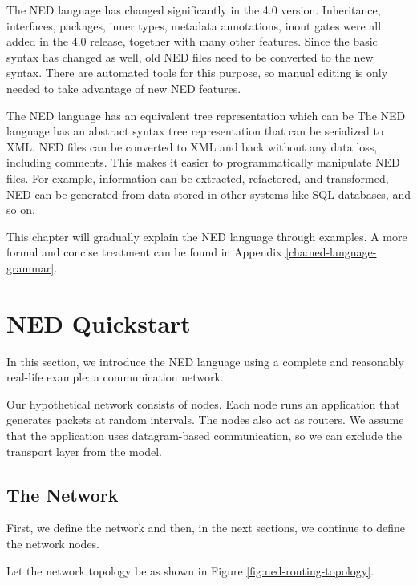 \begin{note}
    The NED language has changed significantly in the 4.0 version.
    Inheritance, interfaces, packages, inner types, metadata annotations, inout
    gates were all added in the 4.0 release, together with many other features.
    Since the basic syntax has changed as well, old NED files need to be
    converted to the new syntax. There are automated tools for this purpose, so
    manual editing is only needed to take advantage of new NED features.
\end{note}

The NED language has an equivalent tree representation which can be
The NED language has an abstract syntax tree representation that can be serialized to
XML. NED files can be converted to XML and back without any data
loss, including comments. This makes it easier to programmatically manipulate
NED files. For example, information can be extracted, refactored, and
transformed, NED can be generated from data stored in other systems like SQL
databases, and so on.

\begin{note}
    This chapter will gradually explain the NED language through examples. A
    more formal and concise treatment can be found in Appendix
    \ref{cha:ned-language-grammar}.
\end{note}


\section{NED Quickstart}
\label{sec:ned-lang:warmup}

In this section, we introduce the NED language using a complete and reasonably
real-life example: a communication network.

Our hypothetical network consists of nodes. Each node runs an application that
generates packets at random intervals. The nodes also act as routers. We assume
that the application uses datagram-based communication, so we can exclude the
transport layer from the model.


\subsection{The Network}
\label{sec:ned-lang:warmup:network}

First, we define the network and then, in the next sections, we continue to
define the network nodes.

Let the network topology be as shown in Figure \ref{fig:ned-routing-topology}.

